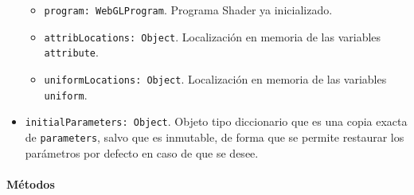 \begin{itemize}
    \begin{itemize}
        \item \verb|program: WebGLProgram|. Programa Shader ya inicializado.
        \item \verb|attribLocations: Object|. Localización en memoria de las variables \verb|attribute|.
        \item \verb|uniformLocations: Object|. Localización en memoria de las variables \verb|uniform|.
    \end{itemize}
    \item \verb|initialParameters: Object|. Objeto tipo diccionario que es una copia exacta de \verb|parameters|, salvo que es inmutable, de forma que se permite restaurar los parámetros por defecto en caso de que se desee.
\end{itemize}

\paragraph*{Métodos}

